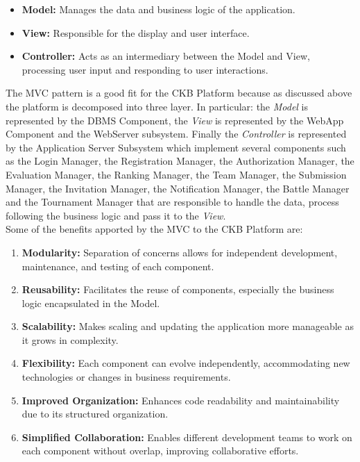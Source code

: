 \begin{itemize}
\begin{itemize}
    \item \textbf{Model:} Manages the data and business logic of the application.
    \item \textbf{View:} Responsible for the display and user interface.
    \item \textbf{Controller:} Acts as an intermediary between the Model and View, processing user input and responding to user interactions.
\end{itemize}
The MVC pattern is a good fit for the CKB Platform because as discussed above the platform is decomposed into three layer. In particular: the \textit{Model} is represented by the DBMS Component, the \textit{View} is represented by the WebApp Component and the WebServer subsystem. Finally the \textit{Controller} is represented by the Application Server Subsystem which implement several components such as the Login Manager, the Registration Manager, the Authorization Manager, the Evaluation Manager, the Ranking Manager, the Team Manager, the Submission Manager, the Invitation Manager, the Notification Manager, the Battle Manager and the Tournament Manager that are responsible to handle the data, process following the business logic and pass it to the \textit{View}. \\
Some of the benefits apported by the MVC to the CKB Platform are:

\begin{enumerate}
    \item \textbf{Modularity:} Separation of concerns allows for independent development, maintenance, and testing of each component.
    \item \textbf{Reusability:} Facilitates the reuse of components, especially the business logic encapsulated in the Model.
    \item \textbf{Scalability:} Makes scaling and updating the application more manageable as it grows in complexity.
    \item \textbf{Flexibility:} Each component can evolve independently, accommodating new technologies or changes in business requirements.
    \item \textbf{Improved Organization:} Enhances code readability and maintainability due to its structured organization.
    \item \textbf{Simplified Collaboration:} Enables different development teams to work on each component without overlap, improving collaborative efforts.
\end{enumerate}


\end{itemize}
